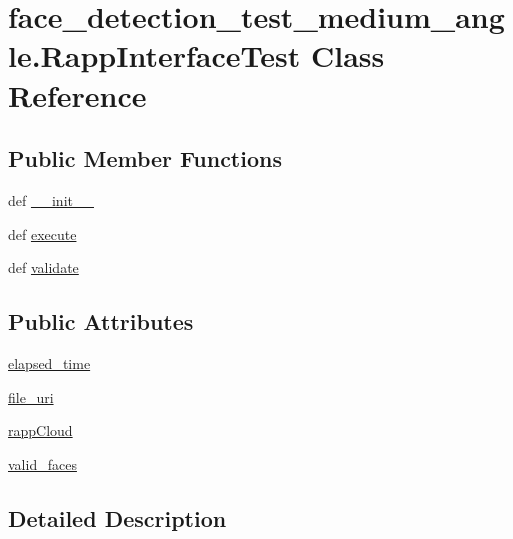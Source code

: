 \hypertarget{classface__detection__test__medium__angle_1_1RappInterfaceTest}{\section{face\-\_\-detection\-\_\-test\-\_\-medium\-\_\-angle.\-Rapp\-Interface\-Test Class Reference}
\label{classface__detection__test__medium__angle_1_1RappInterfaceTest}
}
\subsection*{Public Member Functions}
\begin{DoxyCompactItemize}
\item 
def \hyperlink{classface__detection__test__medium__angle_1_1RappInterfaceTest_a41ce8d443e514c67b551e60721c45980}{\-\_\-\-\_\-init\-\_\-\-\_\-}
\item 
def \hyperlink{classface__detection__test__medium__angle_1_1RappInterfaceTest_a04c714e1a3c573fed1fe1275f49048eb}{execute}
\item 
def \hyperlink{classface__detection__test__medium__angle_1_1RappInterfaceTest_af905412332c15506fb0db1a5c05393b4}{validate}
\end{DoxyCompactItemize}
\subsection*{Public Attributes}
\begin{DoxyCompactItemize}
\item 
\hyperlink{classface__detection__test__medium__angle_1_1RappInterfaceTest_a37ec3f79dabaff6ef2990f8ff300c575}{elapsed\-\_\-time}
\item 
\hyperlink{classface__detection__test__medium__angle_1_1RappInterfaceTest_a5642794796c548657f8cf3144a578560}{file\-\_\-uri}
\item 
\hyperlink{classface__detection__test__medium__angle_1_1RappInterfaceTest_a3c30b934fc78fef18271783c541e5272}{rapp\-Cloud}
\item 
\hyperlink{classface__detection__test__medium__angle_1_1RappInterfaceTest_ad9f0e0c514ef73ca565f1d261bf37384}{valid\-\_\-faces}
\end{DoxyCompactItemize}


\subsection{Detailed Description}


